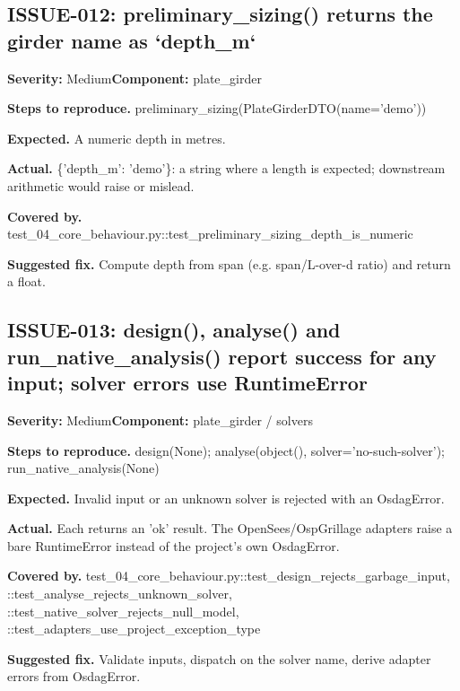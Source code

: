 \subsection*{ISSUE-012: preliminary\_\allowbreak{}sizing() returns the girder name as `depth\_\allowbreak{}m`}
\textbf{Severity:} Medium\quad \textbf{Component:} plate\_\allowbreak{}girder\par
\textbf{Steps to reproduce.} preliminary\_\allowbreak{}sizing(PlateGirderDTO(name='demo'))\par
\textbf{Expected.} A numeric depth in metres.\allowbreak{}\par
\textbf{Actual.} \{'depth\_\allowbreak{}m': 'demo'\}: a string where a length is expected; downstream arithmetic would raise or mislead.\allowbreak{}\par
\textbf{Covered by.} test\_\allowbreak{}04\_\allowbreak{}core\_\allowbreak{}behaviour.\allowbreak{}py::\allowbreak{}test\_\allowbreak{}preliminary\_\allowbreak{}sizing\_\allowbreak{}depth\_\allowbreak{}is\_\allowbreak{}numeric\par
\textbf{Suggested fix.} Compute depth from span (e.\allowbreak{}g.\allowbreak{} span/\allowbreak{}L-over-d ratio) and return a float.\allowbreak{}

\subsection*{ISSUE-013: design(), analyse() and run\_\allowbreak{}native\_\allowbreak{}analysis() report success for any input; solver errors use RuntimeError}
\textbf{Severity:} Medium\quad \textbf{Component:} plate\_\allowbreak{}girder /\allowbreak{} solvers\par
\textbf{Steps to reproduce.} design(None); analyse(object(), solver='no-such-solver'); run\_\allowbreak{}native\_\allowbreak{}analysis(None)\par
\textbf{Expected.} Invalid input or an unknown solver is rejected with an OsdagError.\allowbreak{}\par
\textbf{Actual.} Each returns an 'ok' result.\allowbreak{} The OpenSees/\allowbreak{}OspGrillage adapters raise a bare RuntimeError instead of the project's own OsdagError.\allowbreak{}\par
\textbf{Covered by.} test\_\allowbreak{}04\_\allowbreak{}core\_\allowbreak{}behaviour.\allowbreak{}py::\allowbreak{}test\_\allowbreak{}design\_\allowbreak{}rejects\_\allowbreak{}garbage\_\allowbreak{}input, ::\allowbreak{}test\_\allowbreak{}analyse\_\allowbreak{}rejects\_\allowbreak{}unknown\_\allowbreak{}solver, ::\allowbreak{}test\_\allowbreak{}native\_\allowbreak{}solver\_\allowbreak{}rejects\_\allowbreak{}null\_\allowbreak{}model, ::\allowbreak{}test\_\allowbreak{}adapters\_\allowbreak{}use\_\allowbreak{}project\_\allowbreak{}exception\_\allowbreak{}type\par
\textbf{Suggested fix.} Validate inputs, dispatch on the solver name, derive adapter errors from OsdagError.\allowbreak{}

